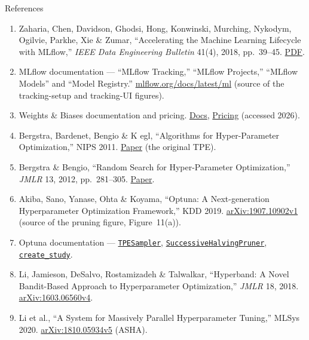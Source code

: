 \begin{frame}[allowframebreaks]{References}
\begin{enumerate}
    \item Zaharia, Chen, Davidson, Ghodsi, Hong, Konwinski, Murching, Nykodym, Ogilvie, Parkhe, Xie \& Zumar,
          ``Accelerating the Machine Learning Lifecycle with MLflow,'' \textit{IEEE Data Engineering Bulletin}
          41(4), 2018, pp.~39--45. \href{http://sites.computer.org/debull/A18dec/p39.pdf}{PDF}.
    \item MLflow documentation --- ``MLflow Tracking,'' ``MLflow Projects,'' ``MLflow Models'' and
          ``Model Registry.'' \href{https://mlflow.org/docs/latest/ml/}{mlflow.org/docs/latest/ml}
          (source of the tracking-setup and tracking-UI figures).
    \item Weights \& Biases documentation and pricing. \href{https://docs.wandb.ai/guides/}{Docs},
          \href{https://wandb.ai/site/pricing/}{Pricing} (accessed 2026).

    \item Bergstra, Bardenet, Bengio \& K egl, ``Algorithms for Hyper-Parameter Optimization,''
          NIPS 2011.
          \href{https://papers.nips.cc/paper_files/paper/2011/hash/86e8f7ab32cfd12577bc2619bc635690-Abstract.html}{Paper}
          (the original TPE).
    \item Bergstra \& Bengio, ``Random Search for Hyper-Parameter Optimization,'' \textit{JMLR} 13, 2012,
          pp.~281--305. \href{https://jmlr.org/papers/v13/bergstra12a.html}{Paper}.
    \item Akiba, Sano, Yanase, Ohta \& Koyama, ``Optuna: A Next-generation Hyperparameter Optimization
          Framework,'' KDD 2019. \href{https://arxiv.org/abs/1907.10902v1}{arXiv:1907.10902v1}
          (source of the pruning figure, Figure~11(a)).
    \item Optuna documentation ---
          \href{https://optuna.readthedocs.io/en/stable/reference/samplers/generated/optuna.samplers.TPESampler.html}{\texttt{TPESampler}},
          \href{https://optuna.readthedocs.io/en/stable/reference/generated/optuna.pruners.SuccessiveHalvingPruner.html}{\texttt{SuccessiveHalvingPruner}},
          \href{https://optuna.readthedocs.io/en/stable/reference/generated/optuna.study.create_study.html}{\texttt{create\_study}}.
    \item Li, Jamieson, DeSalvo, Rostamizadeh \& Talwalkar, ``Hyperband: A Novel Bandit-Based Approach to
          Hyperparameter Optimization,'' \textit{JMLR} 18, 2018.
          \href{https://arxiv.org/abs/1603.06560v4}{arXiv:1603.06560v4}.
    \item Li et al., ``A System for Massively Parallel Hyperparameter Tuning,'' MLSys 2020.
          \href{https://arxiv.org/abs/1810.05934v5}{arXiv:1810.05934v5} (ASHA).


\end{enumerate}
\end{frame}
